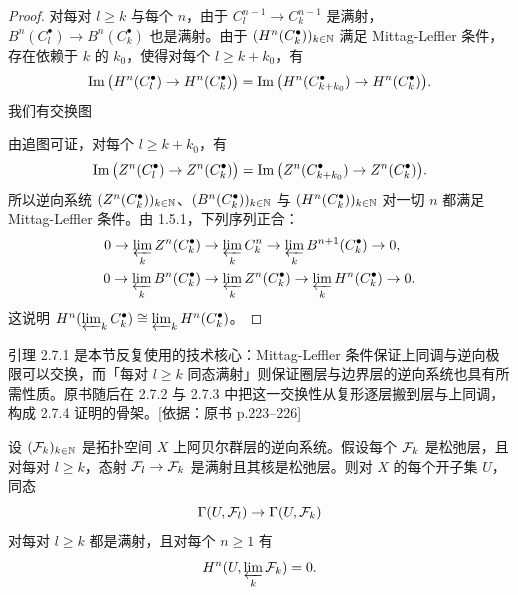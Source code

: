 \begin{proof}
对每对 $l\ge k$ 与每个 $n$，由于 $C_l^{n-1}\to C_k^{n-1}$ 是满射，$B^n(C_l^{\bullet})\to B^n(C_k^{\bullet})$ 也是满射。由于 $(H^n(C_k^{\bullet}))_{k\in\mathbb{N}}$ 满足 Mittag-Leffler 条件，存在依赖于 $k$ 的 $k_0$，使得对每个 $l\ge k+k_0$，有
\begin{equation*}
\operatorname{Im}\big(H^n(C_l^{\bullet})\to H^n(C_k^{\bullet})\big)=\operatorname{Im}\big(H^n(C_{k+k_0}^{\bullet})\to H^n(C_k^{\bullet})\big).
\end{equation*}
我们有交换图

\begin{center}
\end{center}

由追图可证，对每个 $l\ge k+k_0$，有
\begin{equation*}
\operatorname{Im}\big(Z^n(C_l^{\bullet})\to Z^n(C_k^{\bullet})\big)=\operatorname{Im}\big(Z^n(C_{k+k_0}^{\bullet})\to Z^n(C_k^{\bullet})\big).
\end{equation*}
所以逆向系统 $(Z^n(C_k^{\bullet}))_{k\in\mathbb{N}}$、$(B^n(C_k^{\bullet}))_{k\in\mathbb{N}}$ 与 $(H^n(C_k^{\bullet}))_{k\in\mathbb{N}}$ 对一切 $n$ 都满足 Mittag-Leffler 条件。由 1.5.1，下列序列正合：
\begin{align*}
0\to\varprojlim_k Z^n(C_k^{\bullet})&\to\varprojlim_k C_k^n\to\varprojlim_k B^{n+1}(C_k^{\bullet})\to 0,\\
0\to\varprojlim_k B^n(C_k^{\bullet})&\to\varprojlim_k Z^n(C_k^{\bullet})\to\varprojlim_k H^n(C_k^{\bullet})\to 0.
\end{align*}
这说明 $H^n(\varprojlim_k C_k^{\bullet})\cong\varprojlim_k H^n(C_k^{\bullet})$。
\end{proof}

\begin{tnote}
引理 2.7.1 是本节反复使用的技术核心：Mittag-Leffler 条件保证上同调与逆向极限可以交换，而「每对 $l\ge k$ 同态满射」则保证圈层与边界层的逆向系统也具有所需性质。原书随后在 2.7.2 与 2.7.3 中把这一交换性从复形逐层搬到层与上同调，构成 2.7.4 证明的骨架。[依据：原书 p.223–226]
\end{tnote}

\begin{lemma}\label{it:2.7.2}
设 $(\mathcal{F}_k)_{k\in\mathbb{N}}$ 是拓扑空间 $X$ 上阿贝尔群层的逆向系统。假设每个 $\mathcal{F}_k$ 是松弛层，且对每对 $l\ge k$，态射 $\mathcal{F}_l\to\mathcal{F}_k$ 是满射且其核是松弛层。则对 $X$ 的每个开子集 $U$，同态
\begin{equation*}
\Gamma(U,\mathcal{F}_l)\to\Gamma(U,\mathcal{F}_k)
\end{equation*}
对每对 $l\ge k$ 都是满射，且对每个 $n\ge1$ 有
\begin{equation*}
H^n(U,\varprojlim_k\mathcal{F}_k)=0.
\end{equation*}
\end{lemma}

